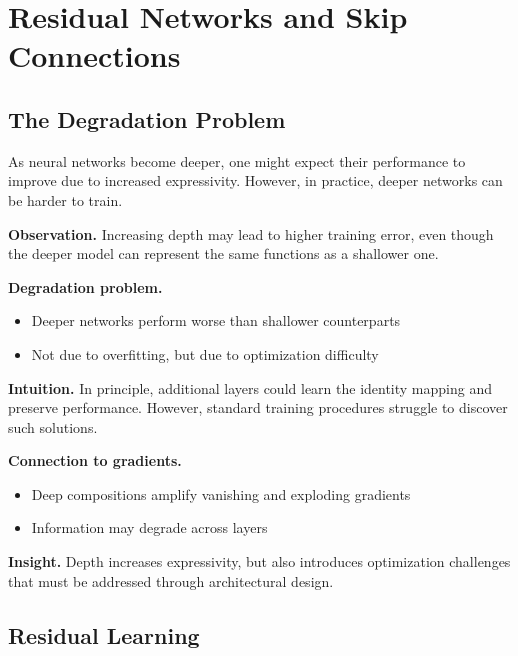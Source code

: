 \chapter{Residual Networks and Skip Connections}

\section{The Degradation Problem}

As neural networks become deeper, one might expect their performance to improve due to increased expressivity. However, in practice, deeper networks can be harder to train.

\medskip

\noindent
\textbf{Observation.}  
Increasing depth may lead to higher training error, even though the deeper model can represent the same functions as a shallower one.

\medskip

\noindent
\textbf{Degradation problem.}
\begin{itemize}
    \item Deeper networks perform worse than shallower counterparts
    \item Not due to overfitting, but due to optimization difficulty
\end{itemize}

\medskip

\noindent
\textbf{Intuition.}  
In principle, additional layers could learn the identity mapping and preserve performance. However, standard training procedures struggle to discover such solutions.

\medskip

\noindent
\textbf{Connection to gradients.}
\begin{itemize}
    \item Deep compositions amplify vanishing and exploding gradients
    \item Information may degrade across layers
\end{itemize}

\medskip

\noindent
\textbf{Insight.}  
Depth increases expressivity, but also introduces optimization challenges that must be addressed through architectural design.

\section{Residual Learning}

